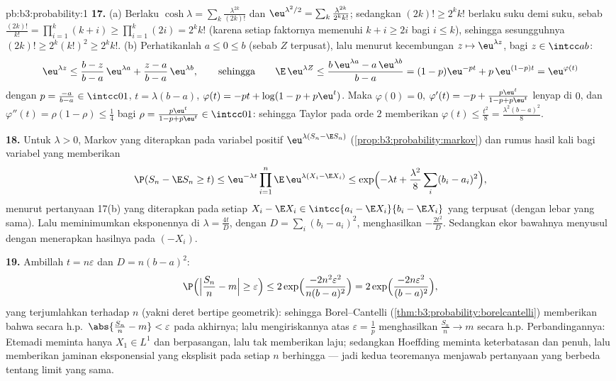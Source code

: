 \begin{solution}{pb:b3:probability:1}
\textbf{17.} (a) Berlaku $\cosh\lambda =
\sum_k\frac{\lambda^{2k}}{(2k)!}$ dan $\eu^{\lambda^2/2} =
\sum_k\frac{\lambda^{2k}}{2^kk!}$; sedangkan $(2k)! \geq 2^kk!$
berlaku suku demi suku, sebab $\frac{(2k)!}{k!} =
\prod_{i=1}^k(k + i) \geq \prod_{i=1}^k(2i) = 2^kk!$ (karena setiap
faktornya memenuhi $k + i \geq 2i$ bagi $i \leq k$), sehingga
sesungguhnya $(2k)! \geq 2^k(k!)^2 \geq 2^kk!$. (b) Perhatikanlah $a \leq 0 \leq b$ (sebab $Z$
terpusat), lalu menurut kecembungan $z \mapsto \eu^{\lambda z}$,
bagi $z \in \intcc ab$:
\[
\eu^{\lambda z} \leq \frac{b - z}{b - a}\,\eu^{\lambda a} +
\frac{z - a}{b - a}\,\eu^{\lambda b},
\qquad\text{sehingga}\qquad
\E\,\eu^{\lambda Z} \leq \frac{b\,\eu^{\lambda a} -
a\,\eu^{\lambda b}}{b - a}
= (1 - p)\eu^{-pt} + p\,\eu^{(1-p)t} = \eu^{\varphi(t)}
\]
dengan $p = \frac{-a}{b-a} \in \intcc01$, $t = \lambda(b -
a)$, $\varphi(t) = -pt + \log(1 - p + p\eu^t)$. Maka
$\varphi(0) = 0$, $\varphi'(t) = -p + \frac{p\eu^t}{1 - p +
p\eu^t}$ lenyap di $0$, dan $\varphi''(t) = \rho(1 -
\rho) \leq \frac14$ bagi $\rho = \frac{p\eu^t}{1 - p +
p\eu^t} \in \intcc01$: sehingga Taylor pada orde $2$ memberikan
$\varphi(t) \leq \frac{t^2}8 = \frac{\lambda^2(b-a)^2}8$.

\textbf{18.} Untuk $\lambda > 0$, Markov yang diterapkan pada
variabel positif $\eu^{\lambda(S_n - \E S_n)}$
(\cref{prop:b3:probability:markov}) dan rumus hasil kali
bagi variabel yang  memberikan
\[
\P(S_n - \E S_n \geq t) \leq \eu^{-\lambda
t}\prod_{i=1}^n\E\,\eu^{\lambda(X_i - \E X_i)}
\leq \exp\Bigl(-\lambda t +
\frac{\lambda^2}8\sum_i(b_i - a_i)^2\Bigr),
\]
menurut pertanyaan 17(b) yang diterapkan pada setiap $X_i - \E X_i
\in \intcc{a_i - \E X_i}{b_i - \E X_i}$ yang terpusat (dengan lebar yang sama).
Lalu meminimumkan eksponennya di $\lambda = \frac{4t}{D}$, dengan $D =
\sum_i(b_i - a_i)^2$, menghasilkan $-\frac{2t^2}D$. Sedangkan ekor
bawahnya menyusul dengan menerapkan hasilnya pada $(-X_i)$.

\textbf{19.} Ambillah $t = n\varepsilon$ dan $D = n(b - a)^2$:
\[
\P\Bigl(\Bigl|\frac{S_n}n - m\Bigr| \geq \varepsilon\Bigr)
\leq 2\exp\Bigl(\frac{-2n^2\varepsilon^2}{n(b-a)^2}\Bigr)
= 2\exp\Bigl(\frac{-2n\varepsilon^2}{(b-a)^2}\Bigr),
\]
yang terjumlahkan terhadap $n$ (yakni deret bertipe geometrik):
sehingga Borel--Cantelli (\cref{thm:b3:probability:borelcantelli})
memberikan bahwa secara h.p.\ $\abs{\frac{S_n}n - m} < \varepsilon$
pada akhirnya; lalu mengiriskannya atas $\varepsilon = \frac1p$
menghasilkan $\frac{S_n}n \to m$ secara h.p. Perbandingannya: Etemadi meminta
hanya $X_1 \in L^1$ dan  berpasangan, lalu tak memberikan
laju; sedangkan Hoeffding meminta keterbatasan dan  penuh,
lalu memberikan jaminan eksponensial yang eksplisit pada setiap
$n$ berhingga --- jadi kedua teoremanya menjawab pertanyaan yang berbeda
tentang limit yang sama.


\end{solution}
